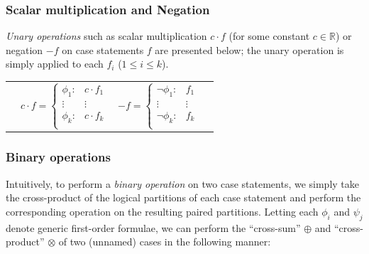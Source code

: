 \documentclass[twoside,11pt]{article}
\begin{document}
\subsubsection*{Scalar multiplication and Negation}
\emph{Unary operations} such as scalar multiplication $c\cdot f$ (for
some constant $c \in \mathbb{R}$) or negation $-f$ on case statements
$f$ are presented below; the unary operation is simply applied to each
$f_i$ ($1 \leq i \leq k$). 
{%
\begin{center}
\begin{tabular}{r c c l}
&
  $c \cdot f = \begin{cases}
    \phi_1  : & c \cdot f_1 \\ 
   \vdots&\vdots\\ 
    \phi_k : & c \cdot f_k \\ 
  \end{cases}$
 &
\vspace{10mm}
  $-f = \begin{cases}
    \neg \phi_1 : & f_1 \\ 
   \vdots&\vdots\\ 
    \neg \phi_k : & f_k \\ 
  \end{cases}$
\end{tabular}
\end{center}
}
\vspace{-9mm} 
\subsubsection*{Binary operations}
Intuitively, to perform a \emph{binary
 operation} on two case statements, we simply take the cross-product
of the logical partitions of each case statement and perform the
corresponding operation on the resulting paired partitions.  Letting
each $\phi_i$ and $\psi_j$ denote generic first-order formulae, we can
perform the ``cross-sum'' $\oplus$ and ``cross-product'' $\otimes$ of two (unnamed) cases in the
following manner:
\end{document}
